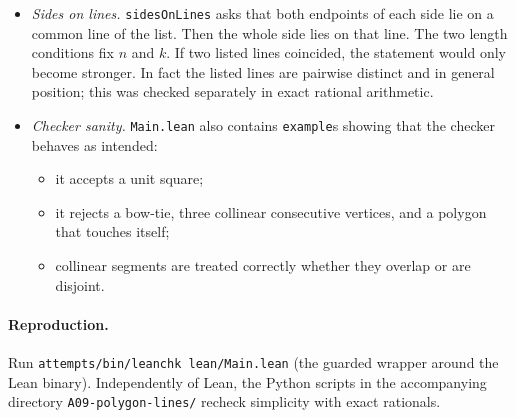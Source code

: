 \begin{itemize}
  the boundary is a Jordan polygon with $k$ sides, as in the definition in \cref{sec:reduction}.
\item \emph{Sides on lines.} \texttt{sidesOnLines} asks that both endpoints of each side lie on a
  common line of the list. Then the whole side lies on that line. The two length conditions fix $n$
  and $k$. If two listed lines coincided, the statement would only become stronger. In fact the listed
  lines are pairwise distinct and in general position; this was checked separately in exact rational
  arithmetic.
\item \emph{Checker sanity.} \texttt{Main.lean} also contains \texttt{example}s showing that the checker
  behaves as intended:
  \begin{itemize}
  \item it accepts a unit square;
  \item it rejects a bow-tie, three collinear consecutive vertices, and a polygon that touches itself;
  \item collinear segments are treated correctly whether they overlap or are disjoint.
  \end{itemize}
\end{itemize}

\paragraph{Reproduction.}
Run \texttt{attempts/bin/leanchk lean/Main.lean} (the guarded wrapper around the Lean binary).
Independently of Lean, the Python scripts in the accompanying directory \texttt{A09-polygon-lines/}
recheck simplicity with exact rationals.
